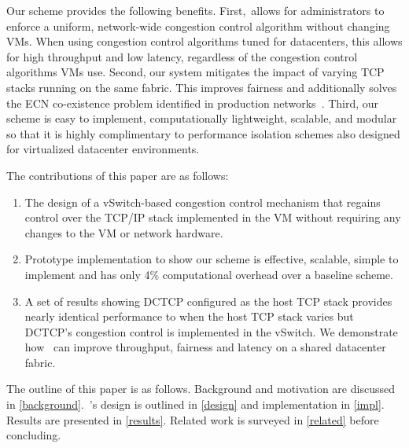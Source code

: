Our scheme provides the following benefits. First,~\acdc allows for 
administrators to enforce a uniform, network-wide congestion control algorithm without changing VMs. When using congestion control algorithms tuned for 
datacenters, this allows for high throughput and low latency, regardless of the congestion control algorithms VMs use. Second,
our system mitigates the impact of varying TCP stacks running on the same fabric. This improves fairness and additionally
solves the ECN co-existence problem identified in production networks~\cite{wu2012tuning,judd2015nsdi}. 
Third, our scheme is easy to implement, computationally lightweight, scalable, and modular so that it is highly complimentary to
performance isolation schemes also designed for virtualized datacenter environments.

The contributions of this paper are as follows:
\begin{enumerate}
\item The design of a vSwitch-based congestion control mechanism that regains control over the TCP/IP stack implemented in
the VM without requiring any changes to the VM or network hardware. 
\item Prototype implementation to show our scheme is effective, scalable, simple to implement and has only 4\% computational
overhead over a baseline scheme.%
\item A set of results showing DCTCP configured as the host TCP stack provides nearly identical
performance to when the host TCP stack varies but DCTCP's congestion control is implemented in the vSwitch. We demonstrate how~\acdc{} can improve
throughput, fairness and latency on a shared datacenter fabric.
\end{enumerate}

The outline of this paper is as follows. Background and motivation are discussed in \cref{background}.~\acdc{}'s design is outlined in \cref{design} and
implementation in \cref{impl}. Results are presented in \cref{results}. Related work is surveyed in \cref{related}
before concluding.

